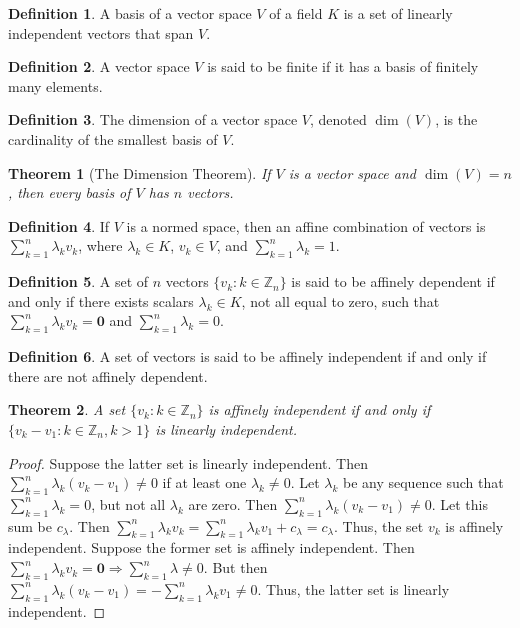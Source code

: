\documentclass[oneside]{book}
\newtheorem{theorem}{Theorem}[section]
\theoremstyle{definition}
\newtheorem{definition}{Definition}[section]
\newcommand*\B[1]{\mathbf{#1}}
\begin{document}
\begin{definition}
A basis of a vector space $V$ of a field $K$ is a set of linearly independent vectors that span $V$.
\end{definition}

\begin{definition}
A vector space $V$ is said to be finite if it has a basis of finitely many elements.
\end{definition}

\begin{definition}
The dimension of a vector space $V$, denoted $\dim(V)$, is the cardinality of the smallest basis of $V$.
\end{definition}

\begin{theorem}[The Dimension Theorem]
If $V$ is a vector space and $\dim(V)=n$, then every basis of $V$ has $n$ vectors.
\end{theorem}

\begin{definition}
If $V$ is a normed space, then an affine combination of vectors is $\sum_{k=1}^{n} \lambda_k v_k$, where $\lambda_k \in K$, $v_k \in V$, and $\sum_{k=1}^{n} \lambda_k = 1$.
\end{definition}

\begin{definition}
A set of $n$ vectors $\{v_k:k\in \mathbb{Z}_n\}$ is said to be affinely dependent if and only if there exists scalars $\lambda_k \in K$, not all equal to zero, such that $\sum_{k=1}^{n} \lambda_k v_k = \B{0}$ and $\sum_{k=1}^{n} \lambda_k = 0$.
\end{definition}

\begin{definition}
A set of vectors is said to be affinely independent if and only if there are not affinely dependent.
\end{definition}

\begin{theorem}
A set $\{v_k:k\in \mathbb{Z}_n\}$ is affinely independent if and only if $\{v_k-v_1:k\in \mathbb{Z}_n, k>1\}$ is linearly independent.
\end{theorem}
\begin{proof}
Suppose the latter set is linearly independent. Then $\sum_{k=1}^{n} \lambda_k(v_k-v_1) \ne 0$ if at least one $\lambda_k \ne 0$. Let $\lambda_k$ be any sequence such that $\sum_{k=1}^{n} \lambda_k = 0$, but not all $\lambda_k$ are zero. Then $\sum_{k=1}^{n} \lambda_k(v_k-v_1)\ne 0$. Let this sum be $c_{\lambda}$. Then $\sum_{k=1}^{n} \lambda_k v_k = \sum_{k=1}^{n} \lambda_k v_1 + c_\lambda = c_{\lambda}$. Thus, the set $v_k$ is affinely independent. Suppose the former set is affinely independent. Then $\sum_{k=1}^{n} \lambda_k v_k = \B{0} \Rightarrow \sum_{k=1}^{n} \lambda \ne 0$. But then $\sum_{k=1}^{n}\lambda_k (v_k-v_1) = - \sum_{k=1}^{n} \lambda_k v_1 \ne 0$. Thus, the latter set is linearly independent.
\end{proof}
\end{document}
